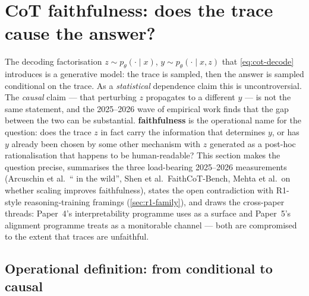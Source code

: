 
\section{CoT faithfulness: does the trace cause the answer?}
\label{sec:cot-faithfulness}

The decoding factorisation $z \sim p_\theta(\cdot \mid x)$,
$y \sim p_\theta(\cdot \mid x, z)$ that
\cref{eq:cot-decode} introduces is a generative model: the trace is
sampled, then the answer is sampled conditional on the trace. As a
\emph{statistical} dependence claim this is uncontroversial. The
\emph{causal} claim — that perturbing $z$ propagates to a different $y$
— is not the same statement, and the 2025--2026 wave of empirical work
finds that the gap between the two can be substantial. \textbf{
faithfulness} is the operational name for the question: does the trace
$z$ in fact carry the information that determines $y$, or has $y$
already been chosen by some other mechanism with $z$ generated as a
post-hoc rationalisation that happens to be human-readable? This
section makes the question precise, summarises the three load-bearing
2025--2026 measurements (Arcuschin et al.\ `` in the wild'', Shen et
al.\ FaithCoT-Bench, Mehta et al.\ on whether scaling improves
faithfulness), states the open contradiction with R1-style
reasoning-training framings (\cref{sec:r1-family}), and draws the
cross-paper threads: Paper~4's interpretability programme uses  as a
 surface and Paper~5's alignment programme treats  as a
monitorable channel — both are compromised to the extent that traces
are unfaithful.

\subsection{Operational definition: from conditional to causal}
\label{sec:faith-def}

